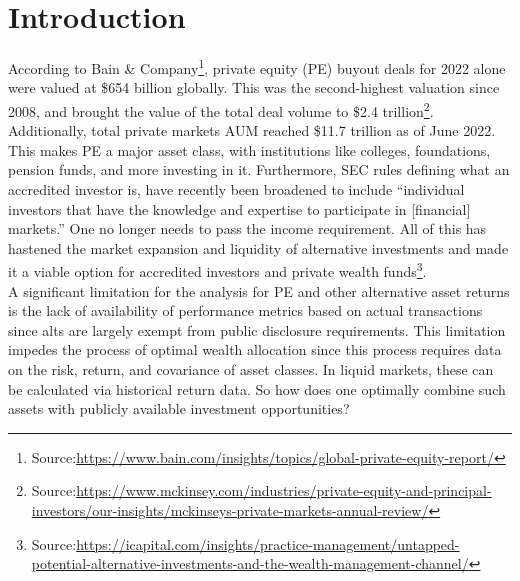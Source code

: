 \documentclass[11pt]{article}
\begin{document}

\setcounter{page}{0}
\thispagestyle{empty}







\section{Introduction} 
\label{sec:introduction}
According to Bain \& Company\footnote{Source:\href{https://www.bain.com/insights/topics/global-private-equity-report/}{https://www.bain.com/insights/topics/global-private-equity-report/}}, private equity (PE) buyout deals for 2022 alone were valued at \$654 billion globally. This was the second-highest valuation since 2008, and brought the value of the total deal volume to \$2.4 trillion\footnote{Source:\href{https://www.mckinsey.com/industries/private-equity-and-principal-investors/our-insights/mckinseys-private-markets-annual-review/}{https://www.mckinsey.com/industries/private-equity-and-principal-investors/our-insights/mckinseys-private-markets-annual-review/}}. Additionally, total private markets AUM reached \$11.7 trillion as of June 2022. This makes PE a major asset class, with institutions like colleges, foundations, pension funds, and more investing in it. Furthermore, SEC rules defining what an accredited investor is, have recently been broadened to include ``individual investors that have the knowledge and expertise to participate in [financial] markets.'' One no longer needs to pass the income requirement. All of this has hastened the market expansion and liquidity of alternative investments and made it a viable option for accredited investors and private wealth funds\footnote{Source:\href{https://icapital.com/insights/practice-management/untapped-potential-alternative-investments-and-the-wealth-management-channel/}{https://icapital.com/insights/practice-management/untapped-potential-alternative-investments-and-the-wealth-management-channel/}}. \\

A significant limitation for the analysis for PE and other alternative asset returns is the lack of availability of performance metrics based on actual transactions since alts are largely exempt from public disclosure requirements. This limitation impedes the process of optimal wealth allocation since this process requires data on the risk, return, and covariance of asset classes. In liquid markets, these can be calculated via historical return data. So how does one optimally combine such assets with publicly available investment opportunities? \\
\end{document}
